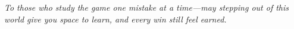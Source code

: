 \cleardoublepage
\begingroup
  \hypersetup{pageanchor=false}%
  \thispagestyle{empty}
  \vspace*{\fill}
  \begin{center}\itshape
  To those who study the game one mistake at a time—may stepping out of this world give you space to learn, and every win still feel earned.
  \end{center}
  \vspace*{\fill}
  \clearpage
\endgroup